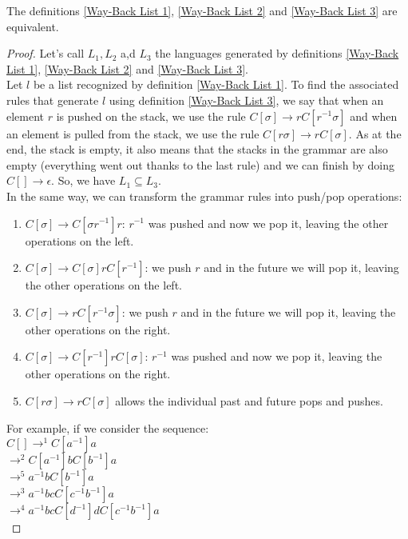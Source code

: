 \documentclass[10pt,a4paper,draft]{article}
\begin{document}
\begin{Theorem}
The definitions \ref{Way-Back List 1}, \ref{Way-Back List 2} and \ref{Way-Back List 3} are equivalent.
\end{Theorem}

\begin{proof}
Let's call $L_1, L_2$ a,d $L_3$ the languages generated by definitions \ref{Way-Back List 1}, \ref{Way-Back List 2} and \ref{Way-Back List 3}. \\
Let $l$ be a list recognized by definition \ref{Way-Back List 1}. To find the associated rules that generate $l$ using definition \ref{Way-Back List 3}, we say that when an element $r$ is pushed on the stack, we use the rule $C[\sigma] \rightarrow r C[r^{-1} \sigma]$ and when an element is pulled from the stack, we use the rule $C[r \sigma] \rightarrow r C[\sigma]$. As at the end, the stack is empty, it also means that the stacks in the grammar are also empty (everything went out thanks to the last rule) and we can finish by doing $C[] \rightarrow \epsilon$. So, we have $L_1 \subseteq L_3$. \\
In the same way, we can transform the grammar rules into push/pop operations:
\begin{enumerate}
\item $C[\sigma] \rightarrow C[\sigma r^{-1}] r$: $r^{-1}$ was pushed and now we pop it, leaving the other operations on the left.
\item $C[\sigma] \rightarrow C[\sigma] r C[r^{-1}]$: we push $r$ and in the future we will pop it, leaving the other operations on the left.
\item $C[\sigma] \rightarrow r C[r^{-1} \sigma]$: we push $r$ and in the future we will pop it, leaving the other operations on the right.
\item $C[\sigma] \rightarrow C[r^{-1}] r C[\sigma]$: $r^{-1}$ was pushed and now we pop it, leaving the other operations on the right.
\item $C[r \sigma] \rightarrow r C[\sigma]$ allows the individual past and future pops and pushes.
\end{enumerate}
For example, if we consider the sequence:\\
$C[] \rightarrow^1 C[a^{-1}] a$ \\
$\rightarrow^2 C[a^{-1}] b C[b^{-1}] a$\\
$\rightarrow^5 a^{-1} b C[b^{-1}]a$\\
$\rightarrow^3 a^{-1} b c C[c^{-1} b^{-1}] a$ \\
$\rightarrow^4 a^{-1} b c C[d^{-1}] d C[c^{-1} b^{-1}] a$ \\

\end{proof}
\end{document}
